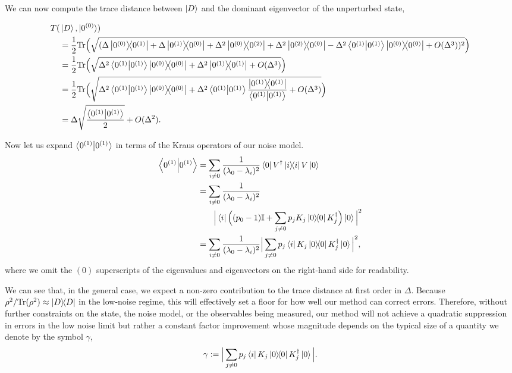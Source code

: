 \documentclass[
amsmath,
amssymb,
aps,
pra,
reprint,
twocolumn,
superscriptaddress,
longbibliography,
showkeys,
floatfix
]{revtex4-1}
\newcommand{\defeq}{\mathrel{\mathop:}=}
\def\bra#1{\ensuremath{\mathinner{\langle{#1}|}}}
\def\ket#1{\ensuremath{\mathinner{|{#1}\rangle}}}
\def\tr{\mathrm{Tr}}
\begin{document}
We can now
compute the trace distance between \(\ket{D}\) and the dominant eigenvector of the unperturbed state,
\begin{widetext}
\begin{align}
  T(&\ket{D}, \ket{0^{(0)}}) \nonumber \\ &= \frac{1}{2} \tr\Big(\sqrt{(\Delta \ketbra{0^{(0)}}{0^{(1)}} + \Delta\ketbra{0^{(1)}}{0^{(0)}} + \Delta^2 \ketbra{0^{(0)}}{0^{(2)}} + \Delta^2\ketbra{0^{(2)}}{0^{(0)}} - \Delta^2 \braket{0^{(1)}} \ketbra{0^{(0)}} + O(\Delta^3))^2} \Big)\nonumber\\
                      &= \frac{1}{2} \tr\Big(\sqrt{\Delta^2 \braket{0^{(1)}}\ketbra{0^{(0)}} + \Delta^2\ketbra{0^{(1)}} + O(\Delta^3)}\Big)\nonumber\\
                      &= \frac{1}{2} \tr\Big(\sqrt{\Delta^2\braket{0^{(1)}}\ketbra{0^{(0)}} + \Delta^2\braket{0^{(1)}} \frac{\ketbra{0^{(1)}}}{\braket{0^{(1)}}} + O(\Delta^3) }\Big) \nonumber\\
                      &= \Delta \sqrt{\frac{\braket{0^{(1)}}}{2}} + O(\Delta^2).
\end{align}
\end{widetext}
Now let us expand \(\braket{0^{(1)}}\) in terms of the Kraus operators of our noise
model. 
\begin{align}
  \braket{0^{(1)}} &= \sum_{i\neq 0} \frac{1}{(\lambda_0 - \lambda_i)^2}\bra{0}V^\dagger\ketbra{i}V\ket{0} \nonumber \\
             &= \sum_{i \neq 0}\frac{1}{(\lambda_0 - \lambda_i)^2} \nonumber \\
             &\;\;\;\;\;\;\;
               \Big|\bra{i}
               \Big((p_0 - 1)\mathbb{I} + \sum_{j \neq 0}p_j K_j \ketbra{0} K_j^\dagger \Big)
               \ket{0} \Big|^2
               \nonumber \\
             &= \sum_{i \neq 0}\frac{1}{(\lambda_0 - \lambda_i)^2}
               \Big|\sum_{j \neq 0} p_j \bra{i}
               K_j \ketbra{0} K_j^\dagger 
               \ket{0}\Big|^2,
\end{align}
where we omit the \((0)\) superscripts of the eigenvalues and eigenvectors on the right-hand side for readability.


We can see that, in the general case, we expect a non-zero contribution to the
trace distance at first order in \(\Delta\). 
Because \(\rho^2 / \tr(\rho^2) \approx \ketbra{D}\) in the low-noise regime,
this will effectively set a floor for how well our method can correct errors. 
Therefore, without further constraints on the state, the noise model, or the
observables being measured, our method will not achieve a quadratic suppression
in errors in the low noise limit but rather a constant factor improvement whose
magnitude depends on the typical size of a quantity we denote by the symbol \(\gamma\), 
\begin{equation}
  \gamma \defeq \Big|\sum_{j \neq 0} p_j \bra{i}
  K_j \ketbra{0} K_j^\dagger 
  \ket{0}\Big|.
  \label{eq:thing_that_must_be_small}
\end{equation}
\end{document}
